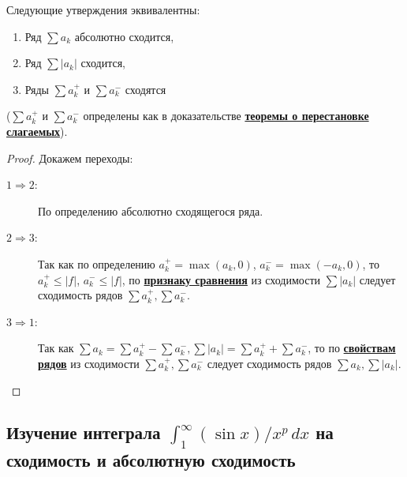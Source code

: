 \begin{ntheorem}[из будущего]
	Следующие утверждения эквивалентны:
	\begin{enumerate}
		\item Ряд \(\sum a_k\) абсолютно сходится,
		\item Ряд \(\sum |a_k|\) сходится,
		\item Ряды \(\sum a_k^+\) и \(\sum a_k^-\) сходятся
	\end{enumerate}
	\big(\(\sum a_k^+\) и \(\sum a_k^-\) определены как в доказательстве \hyperlink{теорема о перестановке слагаемых}{\bfseries теоремы о перестановке слагаемых}\big).
\end{ntheorem}
\begin{proof}
	Докажем переходы:
	\begin{description}
		\item[\(1 \Rightarrow 2\):] По определению абсолютно сходящегося ряда.
		\item[\(2 \Rightarrow 3\):] Так как по определению \(a_k^+ = \max (a_k, 0)\), \(a_k^- = \max (-a_k, 0)\), то \(a_k^+ \leqslant |f|\), \(a_k^- \leqslant |f|\), по \hyperlink{признак сравнения рядов}{\bfseries признаку сравнения} из сходимости \(\sum |a_k|\) следует сходимость рядов \(\sum a_k^+, \sum a_k^-\).
		\item[\(3 \Rightarrow 1\):] Так как \(\sum a_k = \sum a_k^+ - \sum a_k^-, \sum |a_k| = \sum a_k^+ + \sum a_k^-\), то по \hyperlink{свойства рядов}{\bfseries свойствам рядов} из сходимости \(\sum a_k^+, \sum a_k^-\) следует сходимость рядов \(\sum a_k, \sum |a_k|\).
	\end{description}
\end{proof}

\subsection{Изучение интеграла $\int_1^{\infty} (\sin x)/{x^p} \, dx$ на сходимость и абсолютную сходимость}

